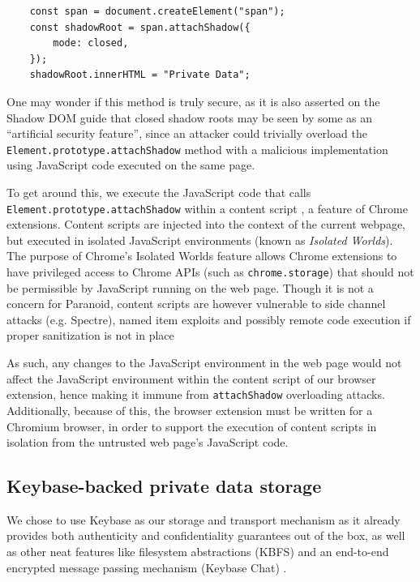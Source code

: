 \documentclass[letterpaper,twocolumn,10pt]{article}
\begin{document}
\begin{center}
    \begin{lstlisting}
    const span = document.createElement("span");
    const shadowRoot = span.attachShadow({
        mode: closed,
    });
    shadowRoot.innerHTML = "Private Data";
    \end{lstlisting}
    \label{fig:shadow_root}
\end{center}

One may wonder if this method is truly secure, as it is also asserted on the Shadow DOM guide \cite{Bidelman} that closed shadow roots may be seen by some as an ``artificial security feature'', since an attacker could trivially overload the \texttt{Element.prototype.attachShadow} method with a malicious implementation using JavaScript code executed on the same page.

To get around this, we execute the JavaScript code that calls \texttt{Element.prototype.attachShadow} within a content script \cite{ContentScript}, a feature of Chrome extensions. Content scripts are injected into the context of the current webpage, but executed in isolated JavaScript environments (known as \textit{Isolated Worlds}). The purpose of Chrome's Isolated Worlds feature allows Chrome extensions to have privileged access to Chrome APIs (such as \texttt{chrome.storage}) that should not be permissible by JavaScript running on the web page. Though it is not a concern for Paranoid, content scripts are however vulnerable to side channel attacks (e.g. Spectre), named item exploits and possibly remote code execution if proper sanitization is not in place\cite{ContentScriptSecurity}

As such, any changes to the JavaScript environment in the web page would not affect the JavaScript environment within the content script of our browser extension, hence making it immune from \texttt{attachShadow} overloading attacks. Additionally, because of this, the browser extension must be written for a Chromium browser, in order to support the execution of content scripts in isolation from the untrusted web page's JavaScript code.

\subsection{Keybase-backed private data storage}

We chose to use Keybase \cite{Keybase} as our storage and transport mechanism as it already provides both authenticity and confidentiality guarantees out of the box, as well as other neat features like filesystem abstractions (KBFS) \cite{KBFS} and an end-to-end encrypted message passing mechanism (Keybase Chat) \cite{KeybaseChat}.
\end{document}
